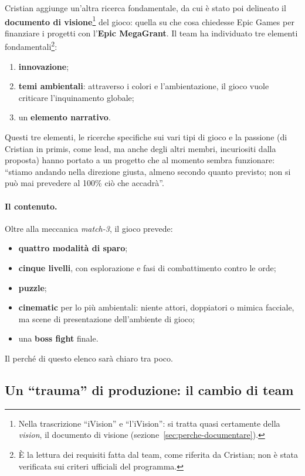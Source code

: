 Cristian aggiunge un'altra ricerca fondamentale, da cui è stato poi delineato
il \textbf{documento di visione}\footnote{Nella trascrizione ``iVision'' e
``l'iVision'': si tratta quasi certamente della \emph{vision}, il documento
di visione (sezione~\ref{sec:perche-documentare}).} del gioco: quella su
che cosa chiedesse Epic Games per finanziare i progetti con l'\textbf{Epic
MegaGrant}. Il team ha individuato tre elementi fondamentali\footnote{È la
lettura dei requisiti fatta dal team, come riferita da Cristian; non è stata
verificata sui criteri ufficiali del programma.}:
\begin{enumerate}
  \item \textbf{innovazione};
  \item \textbf{temi ambientali}: attraverso i colori e l'ambientazione, il
        gioco vuole criticare l'inquinamento globale;
  \item un \textbf{elemento narrativo}.
\end{enumerate}
Questi tre elementi, le ricerche specifiche sui vari tipi di gioco e la
passione (di Cristian in primis, come lead, ma anche degli altri membri,
incuriositi dalla proposta) hanno portato a un progetto che al momento sembra
funzionare: ``stiamo andando nella direzione giusta, almeno secondo quanto
previsto; non si può mai prevedere al 100\% ciò che accadrà''.

\paragraph{Il contenuto.} Oltre alla meccanica \emph{match-3}, il gioco
prevede:
\begin{itemize}
  \item \textbf{quattro modalità di sparo};
  \item \textbf{cinque livelli}, con esplorazione e fasi di combattimento
        contro le orde;
  \item \textbf{puzzle};
  \item \textbf{cinematic} per lo più ambientali: niente attori, doppiatori o
        mimica facciale, ma scene di presentazione dell'ambiente di gioco;
  \item una \textbf{boss fight} finale.
\end{itemize}
Il perché di questo elenco sarà chiaro tra poco.

\subsection{Un ``trauma'' di produzione: il cambio di team}

